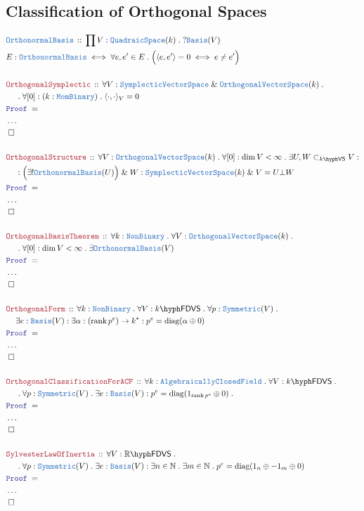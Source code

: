 \documentclass[12pt]{scrartcl}%
\newcommand{\TYPE}[1]{\textcolor{NavyBlue}{\mathtt{#1}}}%
\newcommand{\LOGIC}[1]{\textcolor{Blue}{\mathtt{#1}}}%
\newcommand{\THM}[1]{\textcolor{Maroon}{\mathtt{#1}}}%
\renewcommand{\.}{\; . \;} %
\newcommand{\Theorem}[2]{& \THM{#1} \, :: \, #2 \\ & \Proof = \\ } %
\newcommand{\DeclareType}[2]{& \TYPE{#1} \, :: \, #2 \\}%
\newcommand{\DefineType}[3]{& #1 : \TYPE{#2} \iff #3 \\}%
\newcommand{\NewLine}{\\ & \kern 1pc}%
\newcommand{\Page}[1]{ \begin{align*} #1 \end{align*}  }%
\newcommand{\NoProof}{ & \ldots \\ \EndProof}%
\renewcommand{\And}{\; \& \;}%
\newcommand{\Reals}{\mathbb{R}}%
\newcommand{\Nat}{\mathbb{N}}%
\newcommand{\QED}{\; \square} %
\newcommand{\EndProof}{& \QED \\} %
\newcommand{\Proof}{\LOGIC{Proof} \; } %
\DeclareMathOperator{\rank}{rank} %
\newcommand{\subvec}[1]{\subset_{\VS{#1}}}%
\newcommand{\OBasis}{\TYPE{OrthonormalBasis}}
\newcommand{\OVS}{\TYPE{OrthogonalVectorSpace}}
\newcommand{\SVS}{\TYPE{SymplecticVectorSpace}}
\DeclareMathOperator{\diag}{diag} %
\newcommand{\VS}[1]{#1\hyph\mathsf{VS}} %
\newcommand{\FDVS}[1]{#1\hyph\mathsf{FDVS}} %
\newcommand{\ACF}{\TYPE{AlgebraicallyClosedField}}
\begin{document}
\subsection{Classification of Orthogonal Spaces}
\Page{
	\DeclareType{\OBasis}{\prod V : \TYPE{QuadraicSpace}(k) \. ?\TYPE{Basis}(V)}
	\DefineType{E}{\OBasis}{\forall e,e' \in E \. \Big(\langle e, e' \rangle = 0 \iff e \neq e'\Big)  }
	\\
	\Theorem{OrthogonalSymplectic}{\forall V : \SVS \And \OVS(k) \.  \NewLine \. \forall [0] : (k : \TYPE{MomBinary}) \. \langle \cdot, \cdot \rangle_V = 0}
	\NoProof
	\\
	\Theorem{OrthogonalStructure}{\forall V : \OVS(k) \.  \forall [0] : \dim V < \infty \. \exists U,W \subvec{k} V : \NewLine : \Big( \exists! \OBasis(U) \Big)  \And W : \SVS(k) \And V = U \bot W }
	\NoProof
	\\
	\Theorem{OrthogonalBasisTheorem}{ \forall k : \TYPE{NonBinary} \.  \forall V : \OVS(k) \. \NewLine \. \forall [0] : \dim V < \infty \.  \exists \OBasis(V)  }
	\NoProof
	\\
	\Theorem{OrthogonalForm}{
		\forall k : \TYPE{NonBinary} \. \forall V : \FDVS{k} \. 
		\forall p : \TYPE{Symmetric}(V) \.  \NewLine \exists e : \TYPE{Basis}(V) : 
		\exists \alpha : (\rank p^e) \to k^*:
		p^e = \diag(\alpha \oplus 0)
	}
	\NoProof
	\\
	\Theorem{OrthogonalClassificationForACF}{
		\forall k : \ACF \. 
		\forall V : \FDVS{k} \. \NewLine \.  
		\forall p : \TYPE{Symmetric}(V) \. 
		\exists e : \TYPE{Basis}(V) :  
		p^e = \diag(1_{\rank p^e} \oplus 0) \.
	}
	\NoProof
	\\
	\Theorem{SylvesterLawOfInertia}{
		\forall V : \FDVS{\Reals} \. \NewLine \.  
		\forall p : \TYPE{Symmetric}(V) \. 
		\exists e : \TYPE{Basis}(V) : 
		\exists n \in \Nat \.
		\exists m \in \Nat \.
		p^e = \diag(1_{n} \oplus -1_{m} \oplus 0) 
	}
	\NoProof
}
\end{document}
